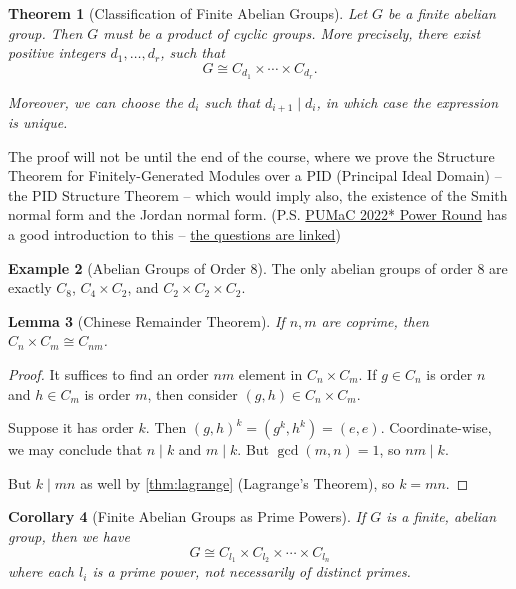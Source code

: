 \documentclass{article}
\newtheorem{theorem}{Theorem}[section]
\newtheorem{lemma}[theorem]{Lemma}
\newtheorem{corollary}[theorem]{Corollary}
\theoremstyle{definition}
\newtheorem{example}[theorem]{Example}
\theoremstyle{remark}
\newcommand{\pqty}[1]{\left(#1\right)}
\newcommand{\isomorphic}{\cong}
\newcommand{\divides}{\mid}
\begin{document}
\begin{theorem}[Classification of Finite Abelian Groups]
    \label{thm:classification-finite-abelian-group}%
    Let \(G\) be a finite abelian group. Then \(G\) must be a product of cyclic groups. More precisely, there exist positive integers \(d_1, \ldots, d_r\), such that
    \[
        G \isomorphic C_{d_1} \times \cdots \times C_{d_r}.
    \]

    Moreover, we can choose the \(d_i\) such that \(d_{i + 1} \divides d_i\), in which case the expression is unique.
\end{theorem}

The proof will not be until the end of the course, where we prove the Structure Theorem for Finitely-Generated Modules over a PID (Principal Ideal Domain) -- the PID Structure Theorem -- which would imply also, the existence of the Smith normal form and the Jordan normal form. (P.S. \href{https://pumac.princeton.edu/archives#2022}{PUMaC 2022* Power Round} has a good introduction to this -- \href{https://static1.squarespace.com/static/570450471d07c094a39efaed/t/642304302502a43377dedfed/1680016432869/PUMaC2023PowerRoundMarch28Update.pdf}{the questions are linked})

\begin{example}[Abelian Groups of Order \(8\)]
    The only abelian groups of order \(8\) are exactly \(C_8\), \(C_4 \times C_2\), and \(C_2 \times C_2 \times C_2\).
\end{example}

\begin{lemma}[Chinese Remainder Theorem]
    \label{lem:chinese-remainder-theorem}
    If \(n, m\) are coprime, then \(C_n \times C_m \isomorphic C_{nm}\).
\end{lemma}

\begin{proof}
    It suffices to find an order \(nm\) element in \(C_n \times C_m\). If \(g \in C_n\) is order \(n\) and \(h \in C_m\) is order \(m\), then consider \(\pqty{g, h} \in C_n \times C_m\).

    Suppose it has order \(k\). Then \(\pqty{g, h}^k = \pqty{g^k, h^k} = \pqty{e, e}\). Coordinate-wise, we may conclude that \(n \divides k\) and \(m \divides k\). But \(\gcd\pqty{m, n} = 1\), so \(nm \divides k\).
    
    But \(k \divides mn\) as well by \autoref{thm:lagrange} (Lagrange's Theorem), so \(k = mn\).
\end{proof}

\begin{corollary}[Finite Abelian Groups as Prime Powers]
    \label{cor:finite-abelian-groups-prime-powers}
    If \(G\) is a finite, abelian group, then we have
    \[
        G \isomorphic C_{l_1} \times C_{l_2} \times \cdots \times C_{l_n}
    \]
    where each \(l_i\) is a prime power, not necessarily of distinct primes.
\end{corollary}
\end{document}
